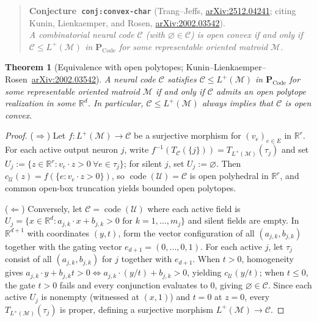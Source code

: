 \documentclass[11pt]{article}
\theoremstyle{plain}
\newtheorem{theorem}{Theorem}
\theoremstyle{definition}
\theoremstyle{remark}
\DeclareMathOperator{\code}{code}
\newcommand{\PCode}{\mathbf{P}_{\mathrm{Code}}}
\begin{document}
\begin{quote}
\textbf{Conjecture~\texttt{conj:convex-char}} (Trang--Jeffs, \href{https://arxiv.org/abs/2512.04241}{arXiv:2512.04241}; citing Kunin, Lienkaemper, and Rosen, \href{https://arxiv.org/abs/2002.03542}{arXiv:2002.03542}).\\
\emph{A combinatorial neural code $\mathcal{C}$ (with $\varnothing \in \mathcal{C}$) is open convex if and only if $\mathcal{C} \le L^+(\mathcal{M})$ in $\PCode$ for some representable oriented matroid $\mathcal{M}$.}
\end{quote}

\begin{theorem}[Equivalence with open polytopes; Kunin--Lienkaemper--Rosen~\href{https://arxiv.org/abs/2002.03542}{arXiv:2002.03542}]\label{thm:klr}
A neural code $\mathcal{C}$ satisfies $\mathcal{C} \le L^+(\mathcal{M})$ in $\PCode$ for some representable oriented matroid $\mathcal{M}$ if and only if $\mathcal{C}$ admits an open polytope realization in some $\mathbb{R}^d$. In particular, $\mathcal{C} \le L^+(\mathcal{M})$ always implies that $\mathcal{C}$ is open convex.
\end{theorem}

\begin{proof}
($\Rightarrow$) Let $f : L^+(\mathcal{M}) \to \mathcal{C}$ be a surjective morphism for $(v_e)_{e \in E}$ in $\mathbb{R}^r$. For each active output neuron $j$, write $f^{-1}(T_{\mathcal{C}}(\{j\})) = T_{L^+(\mathcal{M})}(\tau_j)$ and set $U_j := \{z \in \mathbb{R}^r : v_e \cdot z > 0 \ \forall e \in \tau_j\}$; for silent $j$, set $U_j := \varnothing$. Then $c_{\mathcal{U}}(z) = f(\{e : v_e \cdot z > 0\})$, so $\code(\mathcal{U}) = \mathcal{C}$ is open polyhedral in $\mathbb{R}^r$, and common open-box truncation yields bounded open polytopes.

($\Leftarrow$) Conversely, let $\mathcal{C} = \code(\mathcal{U})$ where each active field is $U_j = \{x \in \mathbb{R}^d : a_{j,k} \cdot x + b_{j,k} > 0 \text{ for } k = 1, \dots, m_j\}$ and silent fields are empty. In $\mathbb{R}^{d+1}$ with coordinates $(y, t)$, form the vector configuration of all $(a_{j,k}, b_{j,k})$ together with the gating vector $e_{d+1} = (0, \dots, 0, 1)$. For each active $j$, let $\tau_j$ consist of all $(a_{j,k}, b_{j,k})$ for $j$ together with $e_{d+1}$. When $t > 0$, homogeneity gives $a_{j,k} \cdot y + b_{j,k} t > 0 \iff a_{j,k} \cdot (y/t) + b_{j,k} > 0$, yielding $c_{\mathcal{U}}(y/t)$; when $t \le 0$, the gate $t > 0$ fails and every conjunction evaluates to $0$, giving $\varnothing \in \mathcal{C}$. Since each active $U_j$ is nonempty (witnessed at $(x, 1)$) and $t = 0$ at $z = 0$, every $T_{L^+(\mathcal{M})}(\tau_j)$ is proper, defining a surjective morphism $L^+(\mathcal{M}) \to \mathcal{C}$.
\end{proof}
\end{document}
